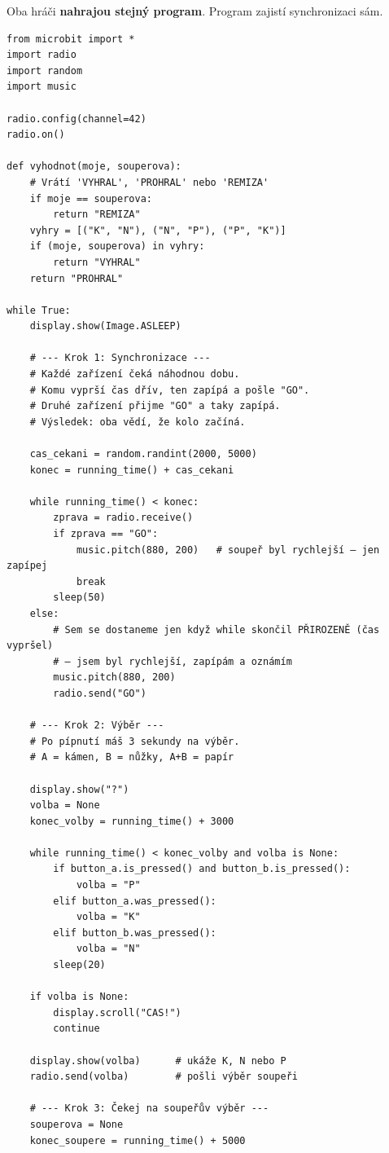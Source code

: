 \begin{bonusukol}

Oba hráči \textbf{nahrajou stejný program}. Program zajistí synchronizaci sám.

\begin{lstlisting}
from microbit import *
import radio
import random
import music

radio.config(channel=42)
radio.on()

def vyhodnot(moje, souperova):
    # Vrátí 'VYHRAL', 'PROHRAL' nebo 'REMIZA'
    if moje == souperova:
        return "REMIZA"
    vyhry = [("K", "N"), ("N", "P"), ("P", "K")]
    if (moje, souperova) in vyhry:
        return "VYHRAL"
    return "PROHRAL"

while True:
    display.show(Image.ASLEEP)

    # --- Krok 1: Synchronizace ---
    # Každé zařízení čeká náhodnou dobu.
    # Komu vyprší čas dřív, ten zapípá a pošle "GO".
    # Druhé zařízení přijme "GO" a taky zapípá.
    # Výsledek: oba vědí, že kolo začíná.

    cas_cekani = random.randint(2000, 5000)
    konec = running_time() + cas_cekani

    while running_time() < konec:
        zprava = radio.receive()
        if zprava == "GO":
            music.pitch(880, 200)   # soupeř byl rychlejší — jen zapípej
            break
        sleep(50)
    else:
        # Sem se dostaneme jen když while skončil PŘIROZENĚ (čas vypršel)
        # — jsem byl rychlejší, zapípám a oznámím
        music.pitch(880, 200)
        radio.send("GO")

    # --- Krok 2: Výběr ---
    # Po pípnutí máš 3 sekundy na výběr.
    # A = kámen, B = nůžky, A+B = papír

    display.show("?")
    volba = None
    konec_volby = running_time() + 3000

    while running_time() < konec_volby and volba is None:
        if button_a.is_pressed() and button_b.is_pressed():
            volba = "P"
        elif button_a.was_pressed():
            volba = "K"
        elif button_b.was_pressed():
            volba = "N"
        sleep(20)

    if volba is None:
        display.scroll("CAS!")
        continue

    display.show(volba)      # ukáže K, N nebo P
    radio.send(volba)        # pošli výběr soupeři

    # --- Krok 3: Čekej na soupeřův výběr ---
    souperova = None
    konec_soupere = running_time() + 5000


\end{lstlisting}
\end{bonusukol}

